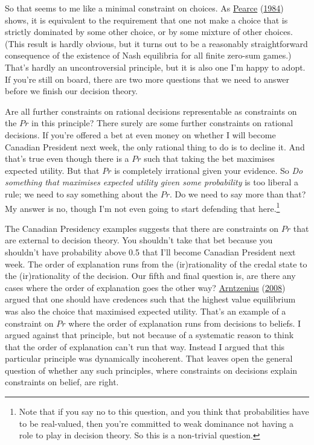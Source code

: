 \documentclass[
  12pt,
]{article}
\begin{document}
So that seems to me like a minimal constraint on choices. As
\protect\hyperlink{ref-Pearce1984}{Pearce}
(\protect\hyperlink{ref-Pearce1984}{1984}) shows, it is equivalent to
the requirement that one not make a choice that is strictly dominated by
some other choice, or by some mixture of other choices. (This result is
hardly obvious, but it turns out to be a reasonably straightforward
consequence of the existence of Nash equilibria for all finite zero-sum
games.) That's hardly an uncontroversial principle, but it is also one
I'm happy to adopt. If you're still on board, there are two more
questions that we need to answer before we finish our decision theory.

Are all further constraints on rational decisions representable as
constraints on the \(Pr\) in this principle? There surely are some
further constraints on rational decisions. If you're offered a bet at
even money on whether I will become Canadian President next week, the
only rational thing to do is to decline it. And that's true even though
there is a \(Pr\) such that taking the bet maximises expected utility.
But that \(Pr\) is completely irrational given your evidence. So
\emph{Do something that maximises expected utility given some
probability} is too liberal a rule; we need to say something about the
\(Pr\). Do we need to say more than that? My answer is no, though I'm
not even going to start defending that here.\footnote{Note that if you
  say no to this question, and you think that probabilities have to be
  real-valued, then you're committed to weak dominance not having a role
  to play in decision theory. So this is a non-trivial question.}

The Canadian Presidency examples suggests that there are constraints on
\(Pr\) that are external to decision theory. You shouldn't take that bet
because you shouldn't have probability above 0.5 that I'll become
Canadian President next week. The order of explanation runs from the
(ir)rationality of the credal state to the (ir)rationality of the
decision. Our fifth and final question is, are there any cases where the
order of explanation goes the other way?
\protect\hyperlink{ref-Arntzenius2008}{Arntzenius}
(\protect\hyperlink{ref-Arntzenius2008}{2008}) argued that one should
have credences such that the highest value equilibrium was also the
choice that maximised expected utility. That's an example of a
constraint on \(Pr\) where the order of explanation runs from decisions
to beliefs. I argued against that principle, but not because of a
systematic reason to think that the order of explanation can't run that
way. Instead I argued that this particular principle was dynamically
incoherent. That leaves open the general question of whether any such
principles, where constraints on decisions explain constraints on
belief, are right.
\end{document}

